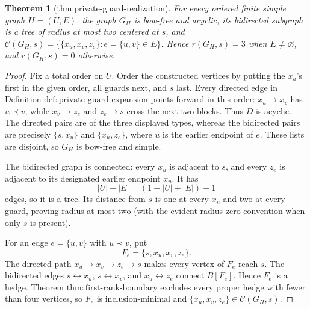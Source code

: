 \documentclass{article}
\newtheorem{theorem}{Theorem}
\begin{document}
\begin{theorem}[thm:private-guard-realization]\label{thm:private-guard-realization}
For every ordered finite simple graph \(H=(U,E)\), the graph \(G_H\) is bow-free and acyclic, its bidirected subgraph is a tree of radius at most two centered at \(s\), and \(\mathcal C(G_H,s)=\{\{x_u,x_v,z_e\}:e=\{u,v\}\in E\}\). Hence \(r(G_H,s)=3\) when \(E\neq\varnothing\), and \(r(G_H,s)=0\) otherwise.
\end{theorem}
\begin{proof}
Fix a total order on \(U\).  Order the constructed vertices by putting the
\(x_u\)'s first in the given order, all guards next, and \(s\) last.  Every
directed edge in Definition \(\mathrm{def{:}private\mbox{-}guard\mbox{-}expansion}\)
points forward in this order: \(x_u\to x_v\) has \(u\prec v\), while
\(x_v\to z_e\) and \(z_e\to s\) cross the next two blocks.  Thus \(D\) is
acyclic.  The directed pairs are of the three displayed types, whereas the
bidirected pairs are precisely \(\{s,x_u\}\) and
\(\{x_u,z_e\}\), where \(u\) is the earlier endpoint of \(e\).  These lists
are disjoint, so \(G_H\) is bow-free and simple.

The bidirected graph is connected: every \(x_u\) is adjacent to \(s\), and
every \(z_e\) is adjacent to its designated earlier endpoint \(x_u\).
It has
\[
 |U|+|E|=(1+|U|+|E|)-1
\]
edges, so it is a tree.  Its distance from \(s\) is one at every \(x_u\)
and two at every guard, proving radius at most two (with the evident radius
zero convention when only \(s\) is present).

For an edge \(e=\{u,v\}\) with \(u\prec v\), put
\[
 F_e=\{s,x_u,x_v,z_e\}.
\]
The directed path \(x_u\to x_v\to z_e\to s\) makes every vertex of
\(F_e\) reach \(s\).  The bidirected edges
\(s\leftrightarrow x_u\), \(s\leftrightarrow x_v\), and
\(x_u\leftrightarrow z_e\) connect \(B[F_e]\).  Hence \(F_e\) is a hedge.
Theorem \(\mathrm{thm{:}first\mbox{-}rank\mbox{-}boundary}\) excludes every
proper hedge with fewer than four vertices, so \(F_e\) is inclusion-minimal
and \(\{x_u,x_v,z_e\}\in\mathcal C(G_H,s)\).


\end{proof}
\end{document}
